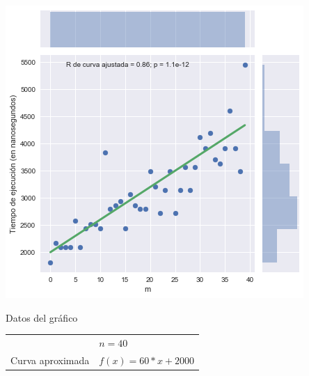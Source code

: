\noindent
\begin{minipage}{0.49\textwidth}
    \hfill
    \includegraphics[scale=0.55]{img/greedy-m-low.png}

    \begin{center}
        Datos del gráfico

        \begin{tabular}{ | l l |}
            \hline
             & $n = 40$ \\
            Curva aproximada & $f(x) = 60 * x + 2000$ \\
            \hline
        \end{tabular}
    \end{center}
\end{minipage}
\hfill
